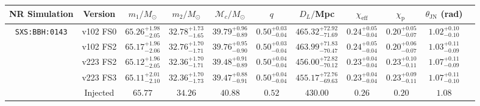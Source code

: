 \documentclass[%
aps,
prd,
amssymb,
amsmath,
amsfonts,
eqsecnum,
showpacs,
nofootinbib,
floatfix,
twocolumn,
twoside,
a4paper,
superscriptaddress
]{revtex4-1}
\begin{document}
\begin{table}[bhpt]
\begin{center}
 \def\arraystretch{1.4 }
\begin{tabular}{  c   c   c   c   c  c  c  c   c  c c   }
\hline
\hline
 NR Simulation & Version &  $m_1/M_\odot$&  $m_2/M_\odot$& $\mathcal{M}_c/M_\odot$&  $q$ &     $D_L/$Mpc&  $\chi_{\text{eff}}$ & $\chi_{\text{p }}$ &$\theta_{\text{JN}}$ (rad)  \\ %
\hline
\multirow{5}{*}{{\tt SXS:BBH:0143}} 
& v102 FS0 & $65.26^{+1.98}_{-2.05}$  & $32.78^{+1.73}_{-1.65}$  & $39.79^{+0.96}_{-0.89}$  & $0.50^{+0.03}_{-0.04}$  & $465.32^{+72.92}_{-71.69}$  & $0.24^{+0.05}_{-0.04}$  & $0.20^{+0.05}_{-0.07}$  & $1.02^{+0.10}_{-0.10}$  \\  & v102 FS2 & $65.17^{+1.96}_{-2.06}$  & $32.76^{+1.70}_{-1.71}$  & $39.76^{+0.95}_{-0.90}$  & $0.50^{+0.03}_{-0.04}$  & $463.99^{+71.83}_{-70.47}$  & $0.24^{+0.05}_{-0.04}$  & $0.20^{+0.06}_{-0.07}$  & $1.03^{+0.11}_{-0.09}$  \\  & v223 FS2 & $65.12^{+1.96}_{-2.05}$  & $32.36^{+1.70}_{-1.71}$  & $39.48^{+0.91}_{-0.89}$  & $0.50^{+0.04}_{-0.04}$  & $456.00^{+72.82}_{-70.12}$  & $0.23^{+0.04}_{-0.04}$  & $0.23^{+0.10}_{-0.11}$  & $1.07^{+0.11}_{-0.09}$  \\  & v223 FS3 & $65.11^{+2.01}_{-2.10}$  & $32.36^{+1.70}_{-1.73}$  & $39.47^{+0.88}_{-0.91}$  & $0.50^{+0.04}_{-0.04}$  & $455.17^{+72.76}_{-69.63}$  & $0.23^{+0.04}_{-0.04}$  & $0.23^{+0.09}_{-0.11}$  & $1.07^{+0.11}_{-0.10}$  \\ & Injected & $65.77$ & $34.26$ & $40.88$ & $0.52$ & $430.00$ & $0.26$ & $0.20$ & $1.08$ \\ 
   
   

\end{tabular}
\end{center}
\end{table}
\end{document}
